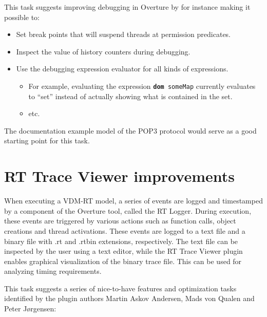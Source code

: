 \documentclass[11pt]{overturerep} \usepackage{t1enc,times,a4,t1enc}
\begin{document}
This task suggests improving debugging in Overture by for instance making it
possible to:

\begin{itemize} \item Set break points that will suspend threads at permission
        predicates.  \item Inspect the value of history counters during
        debugging.  \item Use the debugging expression evaluator for all kinds
        of expressions.  \begin{itemize} \item For example, evaluating the
        expression \texttt{\textbf{dom} someMap} currently evaluates to ``set''
        instead of actually showing what is contained in the set.  \item etc.
    \end{itemize} \end{itemize}

The documentation example model of the POP3 protocol would serve as a good
starting point for this task.

\section{RT Trace Viewer improvements}

When executing a VDM-RT model, a series of events are logged and timestamped by
a component of the Overture tool, called the RT Logger. During execution, these
events are triggered by various actions such as function calls, object
creations and thread activations. These events are logged to a text file and a
binary file with .rt and .rtbin extensions, respectively. The text file can be
inspected by the user using a text editor, while the RT Trace Viewer plugin
enables graphical visualization of the binary trace file. This can be used for
analyzing timing requirements.

This task suggests a series of nice-to-have features and optimization tasks
identified by the plugin authors Martin Askov Andersen, Mads von Qualen and
Peter J\o rgensen:
\end{document}
